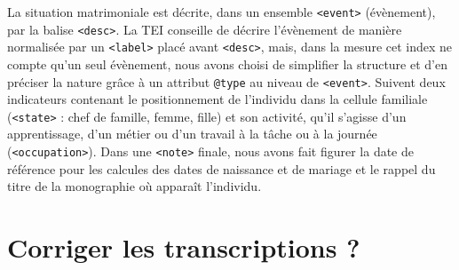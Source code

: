 La situation matrimoniale est décrite, dans un ensemble \texttt{<event>} (évènement), par la balise \texttt{<desc>}. La TEI conseille de décrire l'évènement de manière normalisée par un \texttt{<label>} placé avant \texttt{<desc>}, mais, dans la mesure cet index ne compte qu'un seul évènement, nous avons choisi de simplifier la structure et d'en préciser la nature grâce à un attribut \texttt{@type} au niveau de \texttt{<event>}. Suivent deux indicateurs contenant le positionnement de l'individu dans la cellule familiale (\texttt{<state>} : chef de famille, femme, fille) et son activité, qu'il s'agisse d'un apprentissage, d'un métier ou d'un travail à la tâche ou à la journée (\texttt{<occupation>}). Dans une \texttt{<note>} finale, nous avons fait figurer la date de référence pour les calcules des dates de naissance et de mariage et le rappel du titre de la monographie où apparaît l'individu.

\section{Corriger les transcriptions ?}

